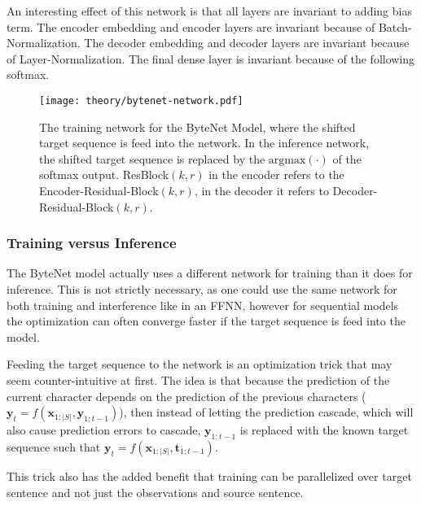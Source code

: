An interesting effect of this network is that all layers are invariant to adding bias term. The encoder embedding and encoder layers are invariant because of Batch-Normalization. The decoder embedding and decoder layers are invariant because of Layer-Normalization. The final dense layer is invariant because of the following softmax.

\begin{figure}[H]
    \centering
    \texttt{[image: theory/bytenet-network.pdf]}
    \caption{The training network for the ByteNet Model, where the shifted target sequence is feed into the network. In the inference network, the shifted target sequence is replaced by the $\mathrm{argmax}(\cdot)$ of the softmax output. ResBlock$(k, r)$ in the encoder refers to the Encoder-Residual-Block$(k, r)$, in the decoder it refers to Decoder-Residual-Block$(k, r)$.}
    \label{fig:bytenet:network}
\end{figure}

\subsubsection{Training versus Inference}
The ByteNet model actually uses a different network for training than it does for inference. This is not strictly necessary, as one could use the same network for both training and interference like in an FFNN, however for sequential models the optimization can often converge faster if the target sequence is feed into the model.

Feeding the target sequence to the network is an optimization trick that may seem counter-intuitive at first. The idea is that because the prediction of the current character depends on the prediction of the previous characters ($\mathbf{y}_t = f(\mathbf{x}_{1:|S|}, \mathbf{y}_{1:t-1})$), then instead of letting the prediction cascade, which will also cause prediction errors to cascade, $\mathbf{y}_{1:t-1}$ is replaced with the known target sequence such that $\mathbf{y}_t = f(\mathbf{x}_{1:|S|}, \mathbf{t}_{1:t-1})$.

This trick also has the added benefit that training can be parallelized over target sentence and not just the observations and source sentence. 

